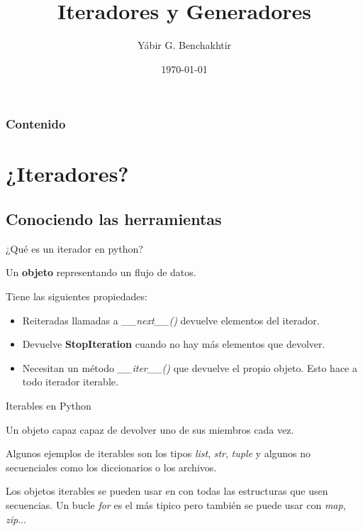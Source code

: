\documentclass[spanish]{beamer}
\title{Iteradores y Generadores}
\date{\today}
\author{Yábir G. Benchakhtir}
\institute{LibreIM}
\begin{document}
  \maketitle

  \begin{frame}\frametitle{Contenido}
    \tableofcontents
  \end{frame} 
  \section{¿Iteradores?}
  \subsection{Conociendo las herramientas}
  \begin{frame}{¿Qué es un iterador en python?}
    \begin{definition}
      Un \textbf{objeto} representando un flujo de datos.
    \end{definition}

    Tiene las siguientes propiedades:

    \begin{itemize}
    \item Reiteradas llamadas a \textit{\_\_next\_\_()} devuelve elementos del iterador.
    \item Devuelve \textbf{StopIteration} cuando no hay más elementos que devolver.
    \item Necesitan un método \textit{\_\_iter\_\_()} que devuelve el
      propio objeto. Esto hace a todo iterador iterable.
    \end{itemize}
  \end{frame}

  \begin{frame}{Iterables en Python}
    \begin{definition}
      Un objeto capaz capaz de devolver uno de sus miembros cada vez.
    \end{definition}

    Algunos ejemplos de iterables son los tipos \textit{list},
    \textit{str}, \textit{tuple} y algunos no secuenciales como los
    diccionarios o los archivos.
  \end{frame}

  \begin{frame}
    Los objetos iterables se pueden usar en con todas las estructuras
    que usen secuencias. Un bucle \textit{for} es el más tipico pero
    también se puede usar con \textit{map}, \textit{zip}...
  \end{frame}
\end{document}
